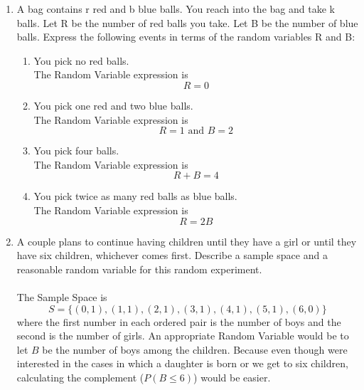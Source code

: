 \documentclass{article}
\begin{document}
\begin{large}
\begin{enumerate}[1.]
\begin{enumerate}[(a)]
		\end{enumerate}
		
		\item A bag contains r red and b blue balls. You reach into the bag and take k balls.
Let R be the number of red balls you take. Let B be the number of blue balls.
Express the following events in terms of the random variables R and B:
		\begin{enumerate}
			\item You pick no red balls.\\
			The Random Variable expression is $$R = 0$$
		
			\item You pick one red and two blue balls.\\
			The Random Variable expression is $$R = 1 \text{ and } B=2$$
		
			\item You pick four balls.\\
			The Random Variable expression is $$R + B = 4$$
		
			\item You pick twice as many red balls as blue balls.\\
			The Random Variable expression is $$R = 2B$$
		\end{enumerate}
		
		\item A couple plans to continue having children until they have a girl or until
they have six children, whichever comes first. Describe a sample space and
a reasonable random variable for this random experiment.\\\\
The Sample Space is $$S = \{(0,1), (1,1), (2,1), (3,1), (4,1), (5,1), (6,0)\}$$ where the first number in each ordered pair is the number of boys and the second is the number of girls. An appropriate Random Variable would be to let $B$ be the number of boys among the children. Because even though were interested in the cases in which a daughter is born or we get to six children, calculating the complement ($P(B \leq 6)$) would be easier. 
		
	\end{enumerate}
\noindent\makebox[\linewidth]{\rule{\paperwidth}{0.4pt}}
	
	\end{large}
\end{document}
